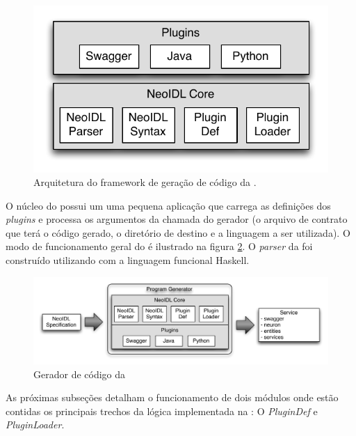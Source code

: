 \begin{figure}[h]
\begin{center}
\includegraphics[scale=0.6]{neoidl.pdf}
\vspace{-.5cm}
\end{center}
\caption{Arquitetura do framework de geração de código da \neoidl{}.}
\label{fig:neoidl-architecture} 
\end{figure}


O núcleo do \framework{} possui um uma pequena aplicação que carrega as
definições dos \textit{plugins} e processa os argumentos da chamada do gerador
(o arquivo de contrato que terá o código gerado, o diretório de destino e a
linguagem a ser utilizada). O modo de funcionamento geral do \framework{} é
ilustrado na figura \ref{fig:programGenerator}. O \textit{parser} da \neoidl{}
foi construído utilizando \bnfc{} \cite{ranta-bnfc:2012} com a linguagem
funcional Haskell.

\begin{figure}[bt]
\begin{center}
\includegraphics[scale=0.55,trim=0cm 1.5cm 0cm 0cm]{programgenerator.pdf}
\vspace{-.5cm}
\end{center}
\caption{Gerador de código da \neoidl{}}
\label{fig:programGenerator}
\end{figure}

As próximas subseções detalham o funcionamento de dois módulos onde estão
contidas os principais trechos da lógica implementada na \neoidl{}: O
\textit{PluginDef} e \textit{PluginLoader}.


